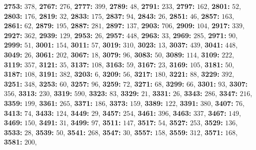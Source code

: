 \textsf{\bfseries 2753:} $378$, \textsf{\bfseries 2767:} $276$, \textsf{\bfseries 2777:} $399$, \textsf{\bfseries 2789:} $48$, \textsf{\bfseries 2791:} $233$, \textsf{\bfseries 2797:} $162$, \textsf{\bfseries 2801:} $52$, \textsf{\bfseries 2803:} $176$, \textsf{\bfseries 2819:} $32$, \textsf{\bfseries 2833:} $175$, \textsf{\bfseries 2837:} $94$, \textsf{\bfseries 2843:} $26$, \textsf{\bfseries 2851:} $46$, \textsf{\bfseries 2857:} $163$, \textsf{\bfseries 2861:} $62$, \textsf{\bfseries 2879:} $195$, \textsf{\bfseries 2887:} $281$, \textsf{\bfseries 2897:} $137$, \textsf{\bfseries 2903:} $706$, \textsf{\bfseries 2909:} $104$, \textsf{\bfseries 2917:} $339$, \textsf{\bfseries 2927:} $362$, \textsf{\bfseries 2939:} $129$, \textsf{\bfseries 2953:} $26$, \textsf{\bfseries 2957:} $448$, \textsf{\bfseries 2963:} $33$, \textsf{\bfseries 2969:} $285$, \textsf{\bfseries 2971:} $90$, \textsf{\bfseries 2999:} $51$, \textsf{\bfseries 3001:} $154$, \textsf{\bfseries 3011:} $57$, \textsf{\bfseries 3019:} $310$, \textsf{\bfseries 3023:} $13$, \textsf{\bfseries 3037:} $439$, \textsf{\bfseries 3041:} $448$, \textsf{\bfseries 3049:} $26$, \textsf{\bfseries 3061:} $202$, \textsf{\bfseries 3067:} $18$, \textsf{\bfseries 3079:} $96$, \textsf{\bfseries 3083:} $50$, \textsf{\bfseries 3089:} $114$, \textsf{\bfseries 3109:} $222$, \textsf{\bfseries 3119:} $357$, \textsf{\bfseries 3121:} $35$, \textsf{\bfseries 3137:} $108$, \textsf{\bfseries 3163:} $59$, \textsf{\bfseries 3167:} $23$, \textsf{\bfseries 3169:} $105$, \textsf{\bfseries 3181:} $50$, \textsf{\bfseries 3187:} $108$, \textsf{\bfseries 3191:} $382$, \textsf{\bfseries 3203:} $6$, \textsf{\bfseries 3209:} $56$, \textsf{\bfseries 3217:} $180$, \textsf{\bfseries 3221:} $88$, \textsf{\bfseries 3229:} $392$, \textsf{\bfseries 3251:} $348$, \textsf{\bfseries 3253:} $60$, \textsf{\bfseries 3257:} $96$, \textsf{\bfseries 3259:} $72$, \textsf{\bfseries 3271:} $68$, \textsf{\bfseries 3299:} $66$, \textsf{\bfseries 3301:} $93$, \textsf{\bfseries 3307:} $356$, \textsf{\bfseries 3313:} $230$, \textsf{\bfseries 3319:} $590$, \textsf{\bfseries 3323:} $83$, \textsf{\bfseries 3329:} $21$, \textsf{\bfseries 3331:} $26$, \textsf{\bfseries 3343:} $286$, \textsf{\bfseries 3347:} $216$, \textsf{\bfseries 3359:} $199$, \textsf{\bfseries 3361:} $265$, \textsf{\bfseries 3371:} $186$, \textsf{\bfseries 3373:} $159$, \textsf{\bfseries 3389:} $122$, \textsf{\bfseries 3391:} $380$, \textsf{\bfseries 3407:} $76$, \textsf{\bfseries 3413:} $74$, \textsf{\bfseries 3433:} $124$, \textsf{\bfseries 3449:} $29$, \textsf{\bfseries 3457:} $254$, \textsf{\bfseries 3461:} $396$, \textsf{\bfseries 3463:} $337$, \textsf{\bfseries 3467:} $149$, \textsf{\bfseries 3469:} $150$, \textsf{\bfseries 3491:} $31$, \textsf{\bfseries 3499:} $97$, \textsf{\bfseries 3511:} $147$, \textsf{\bfseries 3517:} $54$, \textsf{\bfseries 3527:} $253$, \textsf{\bfseries 3529:} $136$, \textsf{\bfseries 3533:} $28$, \textsf{\bfseries 3539:} $50$, \textsf{\bfseries 3541:} $268$, \textsf{\bfseries 3547:} $30$, \textsf{\bfseries 3557:} $158$, \textsf{\bfseries 3559:} $312$, \textsf{\bfseries 3571:} $168$, \textsf{\bfseries 3581:} $200$, 
